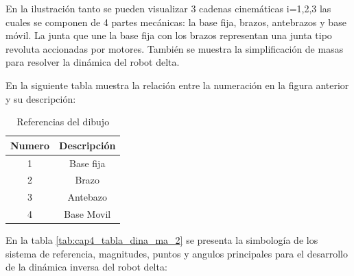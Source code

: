En la ilustración tanto se pueden visualizar 3 cadenas cinemáticas i=1,2,3 las cuales se componen de 4 partes mecánicas: la base fija, brazos, antebrazos y base móvil. La junta que une la base fija con los brazos representan una junta tipo revoluta accionadas por motores. También se muestra la simplificación de masas para resolver la dinámica del robot delta.

En la siguiente tabla muestra la relación entre la numeración en la figura anterior y su descripción:


        \begin{table}[h]
            \centering
            \begin{tabular}{c c}
            \hline
                \textbf{Numero}& \textbf{Descripción} \\ 
            \hline             \hline
             1 & Base fija \\
            \hline
             2 & Brazo \\
            \hline
             3 & Antebazo \\
            \hline
             4 & Base Movil\\
            \hline
            \end{tabular}
           \caption{Referencias del dibujo}
           \label{tab:cap4_tabla_dina_ma_1}
        \end{table}

    \newpage
   
   En la tabla \ref{tab:cap4_tabla_dina_ma_2} se presenta la simbología de los sistema de referencia, magnitudes, puntos y angulos principales para el desarrollo de la dinámica inversa del robot delta:
   
